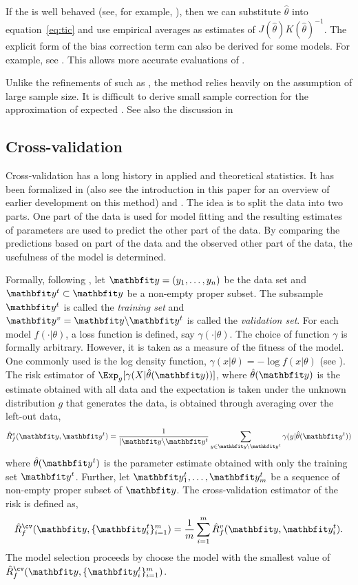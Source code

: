 If the \mle is well behaved (see, for example, \cite{Lehmann:1983vx}), then we
can substitute \mle $\hat\theta$ into equation~\eqref{eq:tic} and use
empirical averages as estimates of $J(\hat\theta)K(\hat\theta)^{-1}$. The
explicit form of the bias correction term can also be derived for some models.
For example, see \cite[][sec.~6.6]{Burnham:2002wc}. This allows more accurate
evaluations of \tic.

Unlike the refinements of \aic such as \aicc, the \tic method relies heavily
on the assumption of large sample size. It is difficult to derive small sample
correction for the \tic approximation of expected \kld. See also the
discussion in \cite[][sec.~6.7.8]{Burnham:2002wc}

\subsection{Cross-validation}
\label{sub:Cross-validation}

Cross-validation has a long history in applied and theoretical statistics. It
has been formalized in \cite{Stone:1974vx} (also see the introduction in this
paper for an overview of earlier development on this method) and
\cite{Geisser:1975vx}. The idea is to split the data into two parts. One part
of the data is used for model fitting and the resulting estimates of
parameters are used to predict the other part of the data. By comparing the
predictions based on part of the data and the observed other part of the data,
the usefulness of the model is determined.

Formally, following \cite{Geisser:1975vx}, let $\data = (y_1,\dots,y_n)$ be
the data set and $\data^t\subset\data$ be a non-empty proper subset. The
subsample $\data^t$ is called the \emph{training set} and $\data^v =
\data\backslash\data^t$ is called the \emph{validation set}. For each model
$f(\cdot|\theta)$, a loss function is defined, say $\gamma(\cdot|\theta)$. The
choice of function $\gamma$ is formally arbitrary. However, it is taken as a
measure of the fitness of the model. One commonly used is the log density
function, $\gamma(x|\theta) = -\log f(x|\theta)$ (see \cite{Stone:1977vx}).
The risk estimator of $\Exp_g[\gamma(X|\hat\theta(\data))]$, where
$\hat\theta(\data)$ is the estimate obtained with all data and the expectation
is taken under the unknown distribution $g$ that generates the data, is
obtained through averaging over the left-out data,
\begin{equation}
  \hat{R}_f^v(\data,\data^t) = \frac{1}{|\data\backslash\data^t}
  \sum_{y\in\data\backslash\data^t}\gamma(y|\hat\theta(\data^t))
\end{equation}
where $\hat\theta(\data^t)$ is the parameter estimate obtained with only the
training set $\data^t$.  Further, let $\data_1^t,\dots,\data_m^t$ be a
sequence of non-empty proper subset of $\data$. The cross-validation estimator
of the risk is defined as,
\begin{equation}
  \hat{R}_f^{\cv}(\data,\{\data_i^t\}_{i=1}^m) =
  \frac{1}{m}\sum_{i=1}^m \hat{R}_f^v(\data,\data_i^t).
\end{equation}
The model selection proceeds by choose the model with the smallest value of
$\hat{R}_f^{\cv}(\data,\{\data_i^t\}_{i=1}^m)$.

